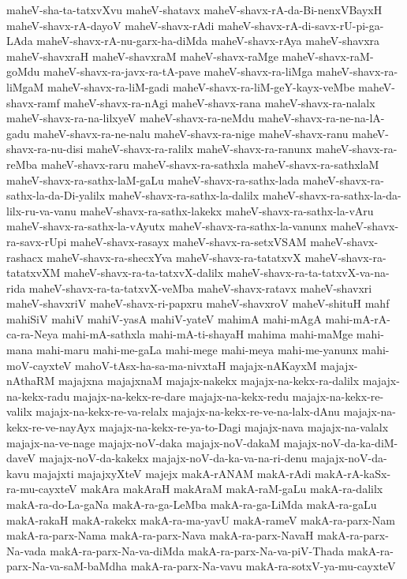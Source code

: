 {maheV-sha-ta-tatxvXvu
maheV-shatavx
maheV-shavx-rA-da-Bi-nenxVBayxH
maheV-shavx-rA-dayoV
maheV-shavx-rAdi
maheV-shavx-rA-di-savx-rU-pi-ga-LAda
maheV-shavx-rA-nu-garx-ha-diMda
maheV-shavx-rAya
maheV-shavxra
maheV-shavxraH
maheV-shavxraM
maheV-shavx-raMge
maheV-shavx-raM-goMdu
maheV-shavx-ra-javx-ra-tA-pave
maheV-shavx-ra-liMga
maheV-shavx-ra-liMgaM
maheV-shavx-ra-liM-gadi
maheV-shavx-ra-liM-geY-kayx-veMbe
maheV-shavx-ramf
maheV-shavx-ra-nAgi
maheV-shavx-rana
maheV-shavx-ra-nalalx
maheV-shavx-ra-na-lilxyeV
maheV-shavx-ra-neMdu
maheV-shavx-ra-ne-na-lA-gadu
maheV-shavx-ra-ne-nalu
maheV-shavx-ra-nige
maheV-shavx-ranu
maheV-shavx-ra-nu-disi
maheV-shavx-ra-ralilx
maheV-shavx-ra-ranunx
maheV-shavx-ra-reMba
maheV-shavx-raru
maheV-shavx-ra-sathxla
maheV-shavx-ra-sathxlaM
maheV-shavx-ra-sathx-laM-gaLu
maheV-shavx-ra-sathx-lada
maheV-shavx-ra-sathx-la-da-Di-yalilx
maheV-shavx-ra-sathx-la-dalilx
maheV-shavx-ra-sathx-la-da-lilx-ru-va-vanu
maheV-shavx-ra-sathx-lakekx
maheV-shavx-ra-sathx-la-vAru
maheV-shavx-ra-sathx-la-vAyutx
maheV-shavx-ra-sathx-la-vanunx
maheV-shavx-ra-savx-rUpi
maheV-shavx-rasayx
maheV-shavx-ra-setxVSAM
maheV-shavx-rashacx
maheV-shavx-ra-shecxYva
maheV-shavx-ra-tatatxvX
maheV-shavx-ra-tatatxvXM
maheV-shavx-ra-ta-tatxvX-dalilx
maheV-shavx-ra-ta-tatxvX-va-na-rida
maheV-shavx-ra-ta-tatxvX-veMba
maheV-shavx-ratavx
maheV-shavxri
maheV-shavxriV
maheV-shavx-ri-papxru
maheV-shavxroV
maheV-shituH
mahf
mahiSiV
mahiV
mahiV-yasA
mahiV-yateV
mahimA
mahi-mAgA
mahi-mA-rA-ca-ra-Neya
mahi-mA-sathxla
mahi-mA-ti-shayaH
mahima
mahi-maMge
mahi-mana
mahi-maru
mahi-me-gaLa
mahi-mege
mahi-meya
mahi-me-yanunx
mahi-moV-cayxteV
mahoV-tAsx-ha-sa-ma-nivxtaH
majajx-nAKayxM
majajx-nAthaRM
majajxna
majajxnaM
majajx-nakekx
majajx-na-kekx-ra-dalilx
majajx-na-kekx-radu
majajx-na-kekx-re-dare
majajx-na-kekx-redu
majajx-na-kekx-re-valilx
majajx-na-kekx-re-va-relalx
majajx-na-kekx-re-ve-na-lalx-dAnu
majajx-na-kekx-re-ve-nayAyx
majajx-na-kekx-re-ya-to-Dagi
majajx-nava
majajx-na-valalx
majajx-na-ve-nage
majajx-noV-daka
majajx-noV-dakaM
majajx-noV-da-ka-diM-daveV
majajx-noV-da-kakekx
majajx-noV-da-ka-va-na-ri-denu
majajx-noV-da-kavu
majajxti
majajxyXteV
majejx
makA-rANAM
makA-rAdi
makA-rA-kaSx-ra-mu-cayxteV
makAra
makAraH
makAraM
makA-raM-gaLu
makA-ra-dalilx
makA-ra-do-La-gaNa
makA-ra-ga-LeMba
makA-ra-ga-LiMda
makA-ra-gaLu
makA-rakaH
makA-rakekx
makA-ra-ma-yavU
makA-rameV
makA-ra-parx-Nam
makA-ra-parx-Nama
makA-ra-parx-Nava
makA-ra-parx-NavaH
makA-ra-parx-Na-vada
makA-ra-parx-Na-va-diMda
makA-ra-parx-Na-va-piV-Thada
makA-ra-parx-Na-va-saM-baMdha
makA-ra-parx-Na-vavu
makA-ra-sotxV-ya-mu-cayxteV
}
